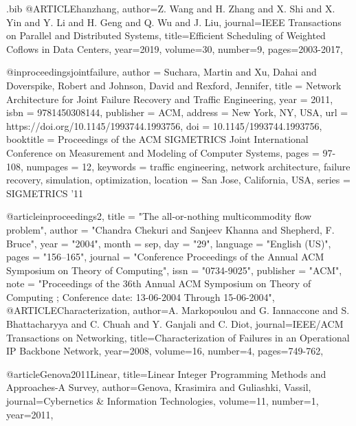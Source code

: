 \documentclass[sigconf]{acmart}
\begin{document}
\begin{filecontents}{\jobname.bib}
@ARTICLE{hanzhang,
  author={Z. {Wang} and H. {Zhang} and X. {Shi} and X. {Yin} and Y. {Li} and H. {Geng} and Q. {Wu} and J. {Liu}},
  journal={IEEE Transactions on Parallel and Distributed Systems}, 
  title={Efficient Scheduling of Weighted Coflows in Data Centers}, 
  year={2019},
  volume={30},
  number={9},
  pages={2003-2017},}
  
@inproceedings{jointfailure, author = {Suchara, Martin and Xu, Dahai and Doverspike, Robert and Johnson, David and Rexford, Jennifer}, title = {Network Architecture for Joint Failure Recovery and Traffic Engineering}, year = {2011}, isbn = {9781450308144}, publisher = {ACM}, address = {New York, NY, USA}, url = {https://doi.org/10.1145/1993744.1993756}, doi = {10.1145/1993744.1993756}, booktitle = {Proceedings of the ACM SIGMETRICS Joint International Conference on Measurement and Modeling of Computer Systems}, pages = {97-108}, numpages = {12}, keywords = {traffic engineering, network architecture, failure recovery, simulation, optimization}, location = {San Jose, California, USA}, series = {SIGMETRICS '11} }

%  



@article{inproceedings2,
title = "The all-or-nothing multicommodity flow problem",
author = "Chandra Chekuri and Sanjeev Khanna and Shepherd, {F. Bruce}",
year = "2004",
month = sep,
day = "29",
language = "English (US)",
pages = "156--165",
journal = "Conference Proceedings of the Annual ACM Symposium on Theory of Computing",
issn = "0734-9025",
publisher = "ACM",
note = "Proceedings of the 36th Annual ACM Symposium on Theory of Computing ; Conference date: 13-06-2004 Through 15-06-2004",
}
@ARTICLE{Characterization,
  author={A. {Markopoulou} and G. {Iannaccone} and S. {Bhattacharyya} and C. {Chuah} and Y. {Ganjali} and C. {Diot}},
  journal={IEEE/ACM Transactions on Networking}, 
  title={Characterization of Failures in an Operational IP Backbone Network}, 
  year={2008},
  volume={16},
  number={4},
  pages={749-762},}

@article{Genova2011Linear,
  title={Linear Integer Programming Methods and Approaches-A Survey},
  author={Genova, Krasimira and Guliashki, Vassil},
  journal={Cybernetics \& Information Technologies},
  volume={11},
  number={1},
  year={2011},
}


\end{filecontents}
\end{document}
